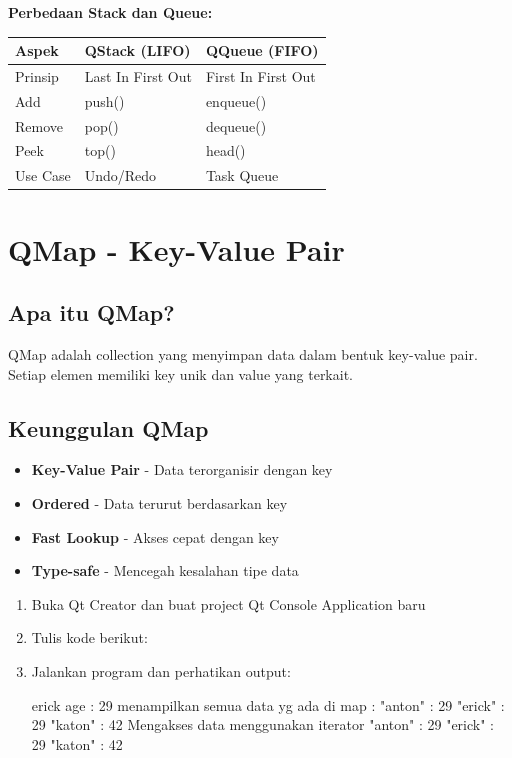 \textbf{Perbedaan Stack dan Queue:}

\begin{center}
\begin{tabular}{|l|l|l|}
\hline
\textbf{Aspek} & \textbf{QStack (LIFO)} & \textbf{QQueue (FIFO)} \\
\hline
Prinsip & Last In First Out & First In First Out \\
\hline
Add & push() & enqueue() \\
\hline
Remove & pop() & dequeue() \\
\hline
Peek & top() & head() \\
\hline
Use Case & Undo/Redo & Task Queue \\
\hline
\end{tabular}
\end{center}

\section{QMap - Key-Value Pair}

\subsection{Apa itu QMap?}

QMap adalah collection yang menyimpan data dalam bentuk key-value pair. Setiap elemen memiliki key unik dan value yang terkait.

\subsection{Keunggulan QMap}

\begin{itemize}
\item \textbf{Key-Value Pair} - Data terorganisir dengan key
\item \textbf{Ordered} - Data terurut berdasarkan key
\item \textbf{Fast Lookup} - Akses cepat dengan key
\item \textbf{Type-safe} - Mencegah kesalahan tipe data
\end{itemize}

\begin{enumerate}
\item Buka Qt Creator dan buat project Qt Console Application baru
\item Tulis kode berikut:



\item Jalankan program dan perhatikan output:

\begin{lcverbatim}
erick age : 29
menampilkan semua data yg ada di map :
"anton" : 29
"erick" : 29
"katon" : 42
Mengakses data menggunakan iterator
"anton" : 29
"erick" : 29
"katon" : 42
\end{lcverbatim}
\end{enumerate}

